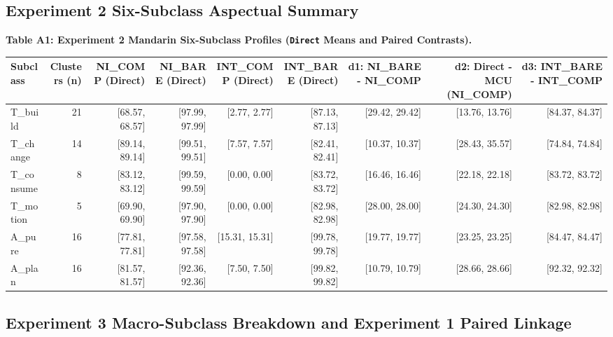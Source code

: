 \documentclass[11pt,a4paper]{article}
\begin{document}
\subsection{Experiment 2 Six-Subclass Aspectual Summary}

\textbf{Table A1: Experiment 2 Mandarin Six-Subclass Profiles (\texttt{Direct} Means and Paired Contrasts).}

\begin{center}\begingroup\small\setlength{\tabcolsep}{4.5pt}\renewcommand{\arraystretch}{1.12}\begin{adjustbox}{max width=\textwidth}\begin{tabular}{lrrrrrrrr}\toprule
\textbf{Subclass} & \textbf{Clusters (n)} & \textbf{NI\_\allowbreak{}COMP (Direct)} & \textbf{NI\_\allowbreak{}BARE (Direct)} & \textbf{INT\_\allowbreak{}COMP (Direct)} & \textbf{INT\_\allowbreak{}BARE (Direct)} & \textbf{d1: NI\_\allowbreak{}BARE - NI\_\allowbreak{}COMP} & \textbf{d2: Direct - MCU (NI\_\allowbreak{}COMP)} & \textbf{d3: INT\_\allowbreak{}BARE - INT\_\allowbreak{}COMP} \\ \midrule
T\_\allowbreak{}build & 21 & [68.57, 68.57] & [97.99, 97.99] & [2.77, 2.77] & [87.13, 87.13] & [29.42, 29.42] & [13.76, 13.76] & [84.37, 84.37] \\
T\_\allowbreak{}change & 14 & [89.14, 89.14] & [99.51, 99.51] & [7.57, 7.57] & [82.41, 82.41] & [10.37, 10.37] & [28.43, 35.57] & [74.84, 74.84] \\
T\_\allowbreak{}consume & 8 & [83.12, 83.12] & [99.59, 99.59] & [0.00, 0.00] & [83.72, 83.72] & [16.46, 16.46] & [22.18, 22.18] & [83.72, 83.72] \\
T\_\allowbreak{}motion & 5 & [69.90, 69.90] & [97.90, 97.90] & [0.00, 0.00] & [82.98, 82.98] & [28.00, 28.00] & [24.30, 24.30] & [82.98, 82.98] \\
A\_\allowbreak{}pure & 16 & [77.81, 77.81] & [97.58, 97.58] & [15.31, 15.31] & [99.78, 99.78] & [19.77, 19.77] & [23.25, 23.25] & [84.47, 84.47] \\
A\_\allowbreak{}plan & 16 & [81.57, 81.57] & [92.36, 92.36] & [7.50, 7.50] & [99.82, 99.82] & [10.79, 10.79] & [28.66, 28.66] & [92.32, 92.32] \\
\bottomrule\end{tabular}\end{adjustbox}\endgroup\end{center}

\subsection{Experiment 3 Macro-Subclass Breakdown and Experiment 1 Paired Linkage}
\end{document}
